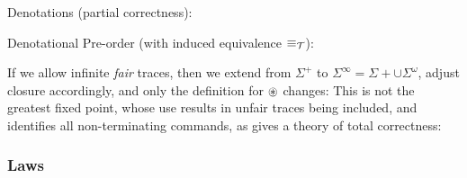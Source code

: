 Denotations (partial correctness):

Denotational Pre-order (with induced equivalence $\equiv_{\mathcal{T}}$):

If we allow infinite \emph{fair} traces, then we extend from $\Sigma^+$
to $\Sigma^\infty = \Sigma+ \cup \Sigma^\omega$, adjust closure
accordingly, and only the definition for $\circledast$ changes:
This is not the greatest fixed point, whose use results in unfair traces being
included,
and identifies all non-terminating commands,
as gives a theory of total correctness:


\subsubsection{Laws}



